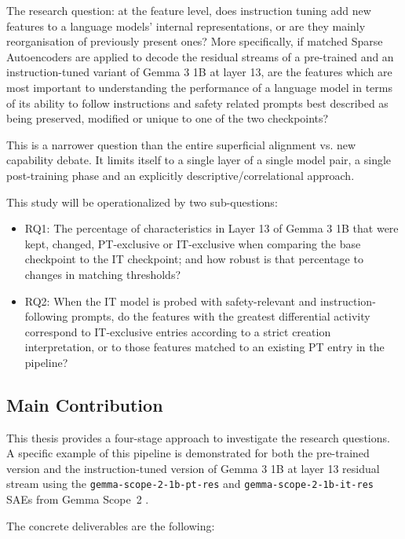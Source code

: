 The research question: at the feature level, does instruction tuning add new features to a language models' internal representations, or are they mainly reorganisation of previously present ones? More specifically, if matched Sparse Autoencoders are applied to decode the residual streams of a pre-trained and an instruction-tuned variant of Gemma 3 1B at layer 13, are the features which are most important to understanding the performance of a language model in terms of its ability to follow instructions and safety related prompts best described as being preserved, modified or unique to one of the two checkpoints?

This is a narrower question than the entire superficial alignment vs. new capability debate. It limits itself to a single layer of a single model pair, a single post-training phase and an explicitly descriptive/correlational approach.

This study will be operationalized by two sub-questions:
\begin{itemize}
    \item RQ1: The percentage of characteristics in Layer 13 of Gemma 3 1B that were kept, changed, PT-exclusive or IT-exclusive when comparing the base checkpoint to the IT checkpoint; and how robust is that percentage to changes in matching thresholds?
    \item RQ2: When the IT model is probed with safety-relevant and instruction-following prompts, do the features with the greatest differential activity correspond to IT-exclusive entries according to a strict creation interpretation, or to those features matched to an existing PT entry in the pipeline?
\end{itemize}

\subsection{Main Contribution}
\label{sec:main-contribution}

This thesis provides a four-stage approach to investigate the research questions. A specific example of this pipeline is demonstrated for both the pre-trained version and the instruction-tuned version of Gemma 3 1B at layer 13 residual stream using the \mbox{\texttt{gemma-scope-2-1b-pt-res}} and \mbox{\texttt{gemma-scope-2-1b-it-res}} SAEs from Gemma Scope~2 \parencite{mcdougall_gemma_scope_2_2025}.

The concrete deliverables are the following:

